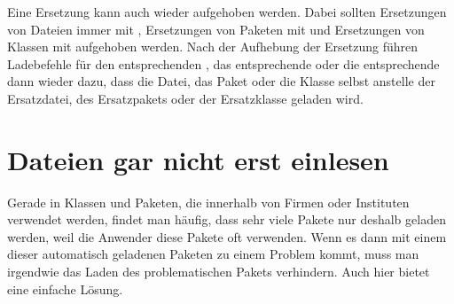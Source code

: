 \begin{Declaration}
\end{Declaration}
Eine Ersetzung kann auch wieder
aufgehoben werden. Dabei sollten Ersetzungen von Dateien immer mit
, Ersetzungen von Paketen mit 
und Ersetzungen von Klassen mit  aufgehoben werden. Nach
der Aufhebung der Ersetzung führen Ladebefehle für den entsprechenden
, das entsprechende  oder die entsprechende
 dann wieder dazu, dass die Datei, das Paket oder die Klasse
selbst anstelle der Ersatzdatei, des Ersatzpakets oder der Ersatzklasse
geladen wird.%
\EndIndexGroup


\section{Dateien gar nicht erst einlesen}

Gerade in Klassen und Paketen, die
innerhalb von Firmen oder Instituten verwendet werden, findet man häufig, dass
sehr viele Pakete nur deshalb geladen werden, weil die Anwender diese Pakete
oft verwenden. Wenn es dann mit einem dieser automatisch geladenen Paketen zu
einem Problem kommt, muss man irgendwie das Laden des problematischen Pakets
verhindern. Auch hier bietet  eine einfache Lösung.

